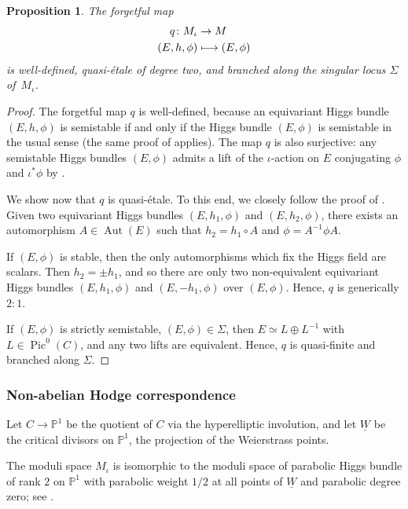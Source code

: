 \documentclass[JEP,XML,SOM,Unicode, NoEqCountersInSection,NoFloatCountersInSection,published]{cedram}
\newcommand\mto{\mathchoice{\longmapsto}{\mapsto}{\mapsto}{\mapsto}}
\newtheorem{prop}[thm]{Proposition}
\theoremstyle{definition}
\newcommand{\PP}{\mathbb{P}}
\newcommand{\Aut}{\operatorname{Aut}}
\newcommand{\Pic}{\operatorname{Pic}}
\begin{document}
\begin{prop}\label{prop:forgetfulmap}
The forgetful map
\begin{align*}
q \colon M_{\iota} &\to M\\
(E, h, \phi) &\mto (E, \phi)
\end{align*}
is well-defined, quasi-étale of degree two, and branched along the singular locus $\Sigma$ of~$M_{\iota}$.
\end{prop}
\begin{proof}
The forgetful map $q$ is well-defined, because an equivariant Higgs bundle $(E, h, \phi)$ is semistable if and only if the Higgs bundle $(E, \phi)$ is semistable in the usual sense (the same proof of \cite[Lem.\,2.7]{Biswas05} applies).
The map $q$ is also surjective: any semistable Higgs bundles $(E, \phi)$ admits a lift of the $\iota$-action on $E$ conjugating $\phi$ and $\iota^*\phi$ by \cite[Chap.\,6,\,p.\,74, \& Th.\,2.1]{HeuLoray19}.

We show now that $q$ is quasi-étale. To this end, we closely follow the proof of \cite[Th.\,2.1]{Kumar00}. Given two equivariant Higgs bundles $(E, h_1, \phi)$ and $(E, h_2, \phi)$, there exists an automorphism $A \in \Aut(E)$ such that $h_2=h_1 \circ A$ and $\phi=A^{-1}\phi A$.

If $(E, \phi)$ is stable, then the only automorphisms which fix the Higgs field are scalars. Then $h_2=\pm h_1$, and so there are only two non-equivalent equivariant Higgs bundles $(E, h_1, \phi)$ and $(E, -h_1, \phi)$ over $(E, \phi)$. Hence, $q$ is generically $2:1$.

If $(E, \phi)$ is strictly semistable, \ie $(E, \phi) \in \Sigma$, then $E \simeq L \oplus L^{-1}$ with $L \in \Pic^0(C)$, and any two lifts are equivalent. Hence, $q$ is quasi-finite and branched along $\Sigma$.
\end{proof}

\subsubsection{Non-abelian Hodge correspondence}
Let $C \to \PP^1$ be the quotient of $C$ via the hyperelliptic involution, and let $\underline{W}$ be the critical divisors on $\PP^1$, \ie the projection of the Weierstrass points.

The moduli space $M_{\iota}$ is isomorphic to the moduli space of parabolic Higgs bundle of rank $2$ on $\PP^1$ with parabolic weight $1/2$ at all points of $\underline{W}$ and parabolic degree zero; see \cite[Th.\,3.5]{BIM13}.
\end{document}

